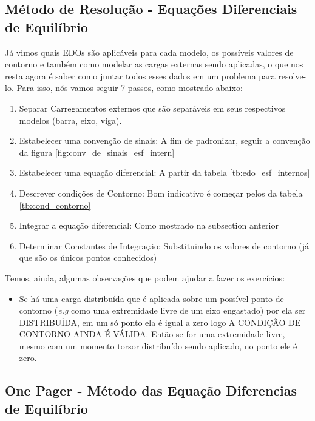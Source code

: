 \documentclass{article}
\begin{document}
        \subsection{Método de Resolução - Equações Diferenciais de Equilíbrio}
            Já vimos quais EDOs são aplicáveis para cada modelo, os possíveis valores de contorno e também como modelar as cargas externas sendo aplicadas, o que nos resta agora é saber como
            juntar todos esses dados em um problema para resolve-lo. Para isso, nós vamos seguir 7 passos, como mostrado abaixo:
            \begin{enumerate}\addtocounter{enumi}{-1}%
                \item Separar Carregamentos externos que são separáveis em seus respectivos modelos (barra, eixo, viga).
                \item Estabelecer uma convenção de sinais: A fim de padronizar, seguir a convenção da figura \ref{fig:conv_de_sinais_esf_intern}
                \item Estabelecer uma equação diferencial: A partir da tabela \ref{tb:edo_esf_internos}
                \item Descrever condições de Contorno: Bom indicativo é começar pelos da tabela \ref{tb:cond_contorno}
                \item Integrar a equação diferencial: Como mostrado na subsection anterior
                \item Determinar Constantes de Integração: Substituindo os valores de contorno (já que são os únicos pontos conhecidos)
            \end{enumerate}

            Temos, ainda, algumas observações que podem ajudar a fazer os exercícios:
            \begin{itemize}
                \item Se há uma carga distribuída que é aplicada sobre um possível ponto de contorno (\emph{e.g} como uma extremidade livre de um eixo engastado) por ela ser DISTRIBUÍDA, em um só
                ponto ela é igual a zero logo A CONDIÇÃO DE CONTORNO AINDA É VÁLIDA. Então se for uma extremidade livre, mesmo com um momento torsor distribuído sendo aplicado, no ponto ele é zero.
            \end{itemize}

            \newpage
        \subsection{One Pager - Método das Equação Diferencias de Equilíbrio}
\end{document}
